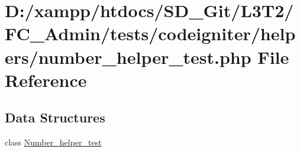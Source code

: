 \hypertarget{number__helper__test_8php}{}\section{D\+:/xampp/htdocs/\+S\+D\+\_\+\+Git/\+L3\+T2/\+F\+C\+\_\+\+Admin/tests/codeigniter/helpers/number\+\_\+helper\+\_\+test.php File Reference}
\label{number__helper__test_8php}
\subsection*{Data Structures}
\begin{DoxyCompactItemize}
\item 
class \hyperlink{class_number__helper__test}{Number\+\_\+helper\+\_\+test}
\end{DoxyCompactItemize}
